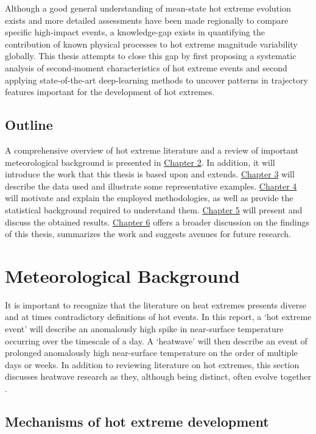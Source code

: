 \documentclass[11pt,a4paper,twoside,openright]{report}
\theoremstyle{definition}
\begin{document}
Although a good general understanding of mean-state hot extreme evolution exists and more detailed assessments have been made regionally to compare specific high-impact events, a knowledge-gap exists in quantifying the contribution of known physical processes to hot extreme magnitude variability globally. This thesis attempts to close this gap by first proposing a systematic analysis of second-moment characteristics of hot extreme events and second applying state-of-the-art deep-learning methods to uncover patterns in trajectory features important for the development of hot extremes.

\section{Outline}\label{outline}

A comprehensive overview of hot extreme literature and a review of important meteorological background is presented in \hyperref[meteorological-background]{Chapter 2}. In addition, it will introduce the work that this thesis is based upon and extends. \hyperref[data]{Chapter 3} will describe the data used and illustrate some representative examples. \hyperref[statistical-methods]{Chapter 4} will motivate and explain the employed methodologies, as well as provide the statistical background required to understand them. \hyperref[results]{Chapter 5} will present and discuss the obtained results. \hyperref[conclusion]{Chapter 6} offers a broader discussion on the findings of this thesis, summarizes the work and suggests avenues for future research.

\chapter{Meteorological Background}\label{meteorological-background}

It is important to recognize that the literature on heat extremes presents diverse and at times contradictory definitions of hot events. In this report, a `hot extreme event' will describe an anomalously high spike in near-surface temperature occurring over the timescale of a day. A `heatwave' will then describe an event of prolonged anomalously high near-surface temperature on the order of multiple days or weeks. In addition to reviewing literature on hot extremes, this section discusses heatwave research as they, although being distinct, often evolve together \citep{robinson_definition_2001}.

\section{Mechanisms of hot extreme development}\label{mechanisms-of-hot-extreme-development}
\end{document}
